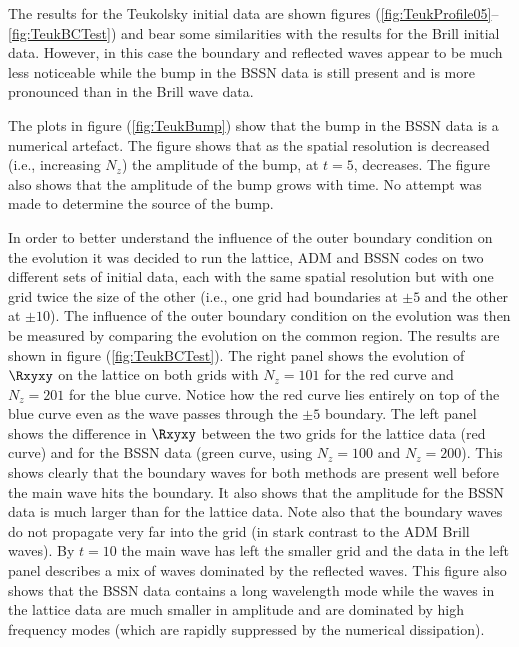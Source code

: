 \documentclass[a4paper,12pt]{article}
\numberwithin{equation}{section}
\begin{document}
The results for the Teukolsky initial data are shown figures
(\ref{fig:TeukProfile05}--\ref{fig:TeukBCTest}) and bear some similarities with the results
for the Brill initial data. However, in this case the boundary and reflected waves appear to
be much less noticeable while the bump in the BSSN data is still present and is more
pronounced than in the Brill wave data.

The plots in figure (\ref{fig:TeukBump}) show that the bump in the BSSN data is a numerical
artefact. The figure shows that as the spatial resolution is decreased (i.e., increasing
$N_z$) the amplitude of the bump, at $t=5$, decreases. The figure also shows that the
amplitude of the bump grows with time. No attempt was made to determine the source of the
bump.

In order to better understand the influence of the outer boundary condition on the evolution
it was decided to run the lattice, ADM and BSSN codes on two different sets of initial data,
each with the same spatial resolution but with one grid twice the size of the other (i.e.,
one grid had boundaries at $\pm5$ and the other at $\pm10$). The influence of the outer
boundary condition on the evolution was then be measured by comparing the evolution on the
common region. The results are shown in figure (\ref{fig:TeukBCTest}). The right panel shows
the evolution of $\Rxyxy$ on the lattice on both grids with $N_z=101$ for the red curve and
$N_z=201$ for the blue curve. Notice how the red curve lies entirely on top of the blue
curve even as the wave passes through the $\pm5$ boundary. The left panel shows the
difference in $\Rxyxy$ between the two grids for the lattice data (red curve) and for the
BSSN data (green curve, using $N_z=100$ and $N_z=200$). This shows clearly that the boundary
waves for both methods are present well before the main wave hits the boundary. It also
shows that the amplitude for the BSSN data is much larger than for the lattice data. Note
also that the boundary waves do not propagate very far into the grid (in stark contrast to
the ADM Brill waves). By $t=10$ the main wave has left the smaller grid and the data in the
left panel describes a mix of waves dominated by the reflected waves. This figure also shows
that the BSSN data contains a long wavelength mode while the waves in the lattice data are
much smaller in amplitude and are dominated by high frequency modes (which are rapidly
suppressed by the numerical dissipation).
\end{document}
